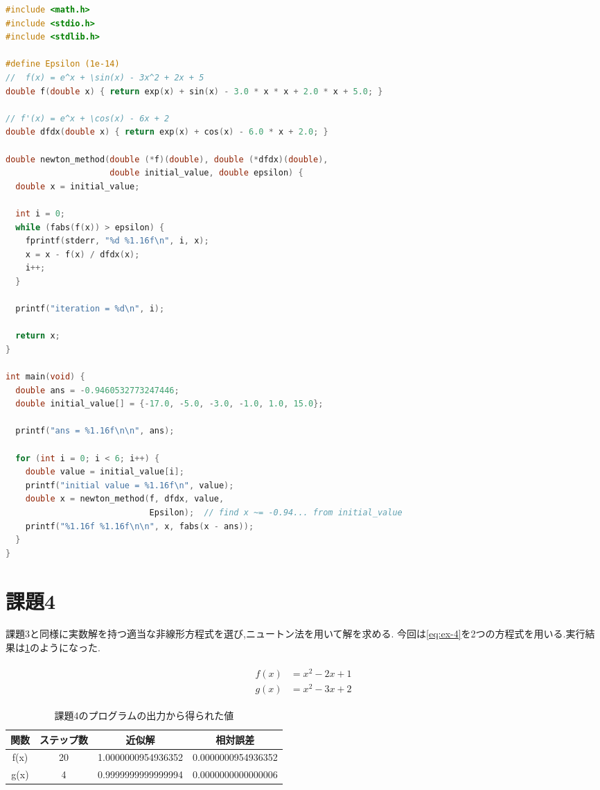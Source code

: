 \documentclass[autodetect-engine, dvi=dvipdfmx, 10pt, a4paper, ja=standard]{bxjsarticle}
\begin{document}
\begin{lstlisting}[language={C}, caption={課題3で使用したソースコード}, label={code:ex-3}]
#include <math.h>
#include <stdio.h>
#include <stdlib.h>

#define Epsilon (1e-14)
// 	f(x) = e^x + \sin(x) - 3x^2 + 2x + 5
double f(double x) { return exp(x) + sin(x) - 3.0 * x * x + 2.0 * x + 5.0; }

// f'(x) = e^x + \cos(x) - 6x + 2
double dfdx(double x) { return exp(x) + cos(x) - 6.0 * x + 2.0; }

double newton_method(double (*f)(double), double (*dfdx)(double),
                     double initial_value, double epsilon) {
  double x = initial_value;

  int i = 0;
  while (fabs(f(x)) > epsilon) {
    fprintf(stderr, "%d %1.16f\n", i, x);
    x = x - f(x) / dfdx(x);
    i++;
  }

  printf("iteration = %d\n", i);

  return x;
}

int main(void) {
  double ans = -0.9460532773247446;
  double initial_value[] = {-17.0, -5.0, -3.0, -1.0, 1.0, 15.0};

  printf("ans = %1.16f\n\n", ans);

  for (int i = 0; i < 6; i++) {
    double value = initial_value[i];
    printf("initial value = %1.16f\n", value);
    double x = newton_method(f, dfdx, value,
                             Epsilon);  // find x ~= -0.94... from initial_value
    printf("%1.16f %1.16f\n\n", x, fabs(x - ans));
  }
}
\end{lstlisting}


\section{課題4}
\label{sec:ex-4}

課題3と同様に実数解を持つ適当な非線形方程式を選び,ニュートン法を用いて解を求める.
今回は\ref{eq:ex-4}を2つの方程式を用いる.実行結果は\ref{table:ex-4}のようになった.

\begin{align}
	\begin{split}
		\label{eq:ex-4}
		f(x) & = x^2 - 2x + 1 \\
		g(x) & = x^2 - 3x + 2
	\end{split}
\end{align}

\begin{table}[htbp]
	\centering
	\caption{課題4のプログラムの出力から得られた値}
	\label{table:ex-4}
	\begin{tabular}{@{}cccc@{}}
		\toprule
		関数   & ステップ数 & 近似解                & 相対誤差               \\ \midrule
		f(x) & 20    & 1.0000000954936352 & 0.0000000954936352 \\
		g(x) & 4     & 0.9999999999999994 & 0.0000000000000006 \\ \bottomrule
	\end{tabular}
\end{table}
\end{document}

